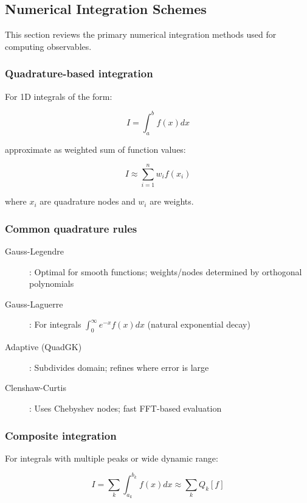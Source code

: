 \subsection{Numerical Integration Schemes}\label{subsec:num_integration}

This section reviews the primary numerical integration methods used for computing observables.

\subsubsection{Quadrature-based integration}

For 1D integrals of the form:

\begin{equation}
I = \int_a^b f(x) dx
\end{equation}

approximate as weighted sum of function values:

\begin{equation}
I \approx \sum_{i=1}^n w_i f(x_i)
\end{equation}

where $x_i$ are quadrature nodes and $w_i$ are weights.

\subsubsection{Common quadrature rules}

\begin{description}
    \item[Gauss-Legendre]: Optimal for smooth functions; weights/nodes determined by orthogonal polynomials
    \item[Gauss-Laguerre]: For integrals $\int_0^\infty e^{-x} f(x) dx$ (natural exponential decay)
    \item[Adaptive (QuadGK)]: Subdivides domain; refines where error is large
    \item[Clenshaw-Curtis]: Uses Chebyshev nodes; fast FFT-based evaluation
\end{description}

\subsubsection{Composite integration}

For integrals with multiple peaks or wide dynamic range:

\begin{equation}
I = \sum_k \int_{a_k}^{b_k} f(x) dx \approx \sum_k Q_k[f]
\end{equation}

